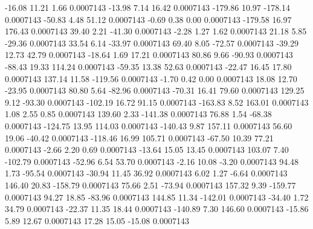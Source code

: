       -16.08       11.21        1.66     0.0007143
      -13.98        7.14       16.42     0.0007143
     -179.86       10.97     -178.14     0.0007143
      -50.83        4.48       51.12     0.0007143
       -0.69        0.38        0.00     0.0007143
     -179.58       16.97      176.43     0.0007143
       39.40        2.21      -41.30     0.0007143
       -2.28        1.27        1.62     0.0007143
       21.18        5.85      -29.36     0.0007143
       33.54        6.14      -33.97     0.0007143
       69.40        8.05      -72.57     0.0007143
      -39.29       12.73       42.79     0.0007143
      -18.64        1.69       17.21     0.0007143
       80.86        9.66      -90.93     0.0007143
      -88.43       19.33      114.24     0.0007143
      -59.35       13.38       52.63     0.0007143
      -22.47       16.45       17.80     0.0007143
      137.14       11.58     -119.56     0.0007143
       -1.70        0.42        0.00     0.0007143
       18.08       12.70      -23.95     0.0007143
       80.80        5.64      -82.96     0.0007143
      -70.31       16.41       79.60     0.0007143
      129.25        9.12      -93.30     0.0007143
     -102.19       16.72       91.15     0.0007143
     -163.83        8.52      163.01     0.0007143
        1.08        2.55        0.85     0.0007143
      139.60        2.33     -141.38     0.0007143
       76.88        1.54      -68.38     0.0007143
     -124.75       13.95      114.03     0.0007143
     -140.43        9.87      157.11     0.0007143
       56.60       19.06      -40.42     0.0007143
     -118.46       16.99      105.71     0.0007143
      -67.50       10.39       77.21     0.0007143
       -2.66        2.20        0.69     0.0007143
      -13.64       15.05       13.45     0.0007143
      103.07        7.40     -102.79     0.0007143
      -52.96        6.54       53.70     0.0007143
       -2.16       10.08       -3.20     0.0007143
       94.48        1.73      -95.54     0.0007143
      -30.94       11.45       36.92     0.0007143
        6.02        1.27       -6.64     0.0007143
      146.40       20.83     -158.79     0.0007143
       75.66        2.51      -73.94     0.0007143
      157.32        9.39     -159.77     0.0007143
       94.27       18.85      -83.96     0.0007143
      144.85       11.34     -142.01     0.0007143
      -34.40        1.72       34.79     0.0007143
      -22.37       11.35       18.44     0.0007143
     -140.89        7.30      146.60     0.0007143
      -15.86        5.89       12.67     0.0007143
       17.28       15.05      -15.08     0.0007143
